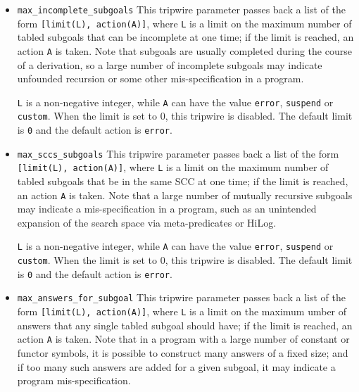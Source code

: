 \begin{description}
\begin{itemize}
To understand the use of this flag, consider the program fragment:
\begin{verbatim}
:- table p/1.
p(f(X)):- p(X).          p(a).
\end{verbatim}
  is tabled, the model for the goal {\tt ?- p(X)} is infinite, so that
  this program will not terminate.  
%
{\tt L} is a non-negative integer, while {\tt A} can have the value
 {\tt abstract}, {\tt error}, {\tt suspend} or {\tt custom}.  When the
 limit is set to 0, this tripwire is disabled.  The default limit is
 {\tt 0} and the default action is {\tt error}.

\item {\tt max\_incomplete\_subgoals} This tripwire parameter passes
 back a list of the form {\tt [limit(L), action(A)]}, where {\tt L} is a
 limit on the maximum number of tabled subgoals that can be incomplete
 at one time; if the limit is reached, an action {\tt A} is taken.
 Note that subgoals are usually completed during the course of a
 derivation, so a large number of incomplete subgoals may indicate
 unfounded recursion or some other mis-specification in a program.

{\tt L} is a non-negative integer, while {\tt A} can have the value
 {\tt error}, {\tt suspend} or {\tt custom}.  When the limit is set to
 0, this tripwire is disabled.  The default limit is {\tt 0} and the
 default action is {\tt error}.

\item {\tt max\_sccs\_subgoals} This tripwire parameter passes back a
 list of the form {\tt [limit(L), action(A)]}, where {\tt L} is a limit
 on the maximum number of tabled subgoals that be in the same SCC at
 one time; if the limit is reached, an action {\tt A} is taken.  Note
 that a large number of mutually recursive subgoals may indicate a
 mis-specification in a program, such as an unintended expansion of
 the search space via meta-predicates or HiLog.

{\tt L} is a non-negative integer, while {\tt A} can have the value
 {\tt error}, {\tt suspend} or {\tt custom}.  When the limit is set to
 0, this tripwire is disabled.  The default limit is {\tt 0} and the
 default action is {\tt error}.

\item {\tt max\_answers\_for\_subgoal} This tripwire parameter passes
 back a list of the form {\tt [limit(L), action(A)]}, where {\tt L} is a
 limit on the maximum umber of answers that any single tabled subgoal
 should have; if the limit is reached, an action {\tt A} is taken.
  Note that in a program with a large number of constant or functor
  symbols, it is possible to construct many answers of a
  fixed size; and if too many such answers are added for a given
  subgoal, it may indicate a program mis-specification.  


\end{itemize}
\end{description}
